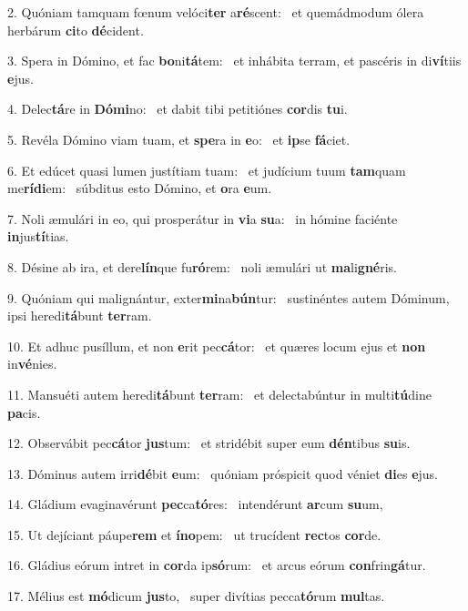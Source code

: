 2. Quóniam tamquam fœnum velóci\textbf{ter} a\textbf{ré}scent: \ast\  et quemádmodum ólera herbárum \textbf{ci}to \textbf{dé}cident.\

3. Spera in Dómino, et fac \textbf{bo}ni\textbf{tá}tem: \ast\  et inhábita terram, et pascéris in di\textbf{ví}tiis \textbf{e}jus.\

4. Delec\textbf{tá}re in \textbf{Dó}\textbf{mi}no: \ast\  et dabit tibi petitiónes \textbf{cor}dis \textbf{tu}i.\

5. Revéla Dómino viam tuam, et \textbf{spe}ra in \textbf{e}o: \ast\  et \textbf{ip}se \textbf{fá}ciet.\

6. Et edúcet quasi lumen justítiam tuam: \dag\  et judícium tuum \textbf{tam}quam me\textbf{rí}\textbf{di}em: \ast\  súbditus esto Dómino, et \textbf{o}ra \textbf{e}um.\

7. Noli æmulári in eo, qui prosperátur in \textbf{vi}a \textbf{su}a: \ast\  in hómine faciénte \textbf{in}jus\textbf{tí}tias.\

8. Désine ab ira, et dere\textbf{lín}que fu\textbf{ró}rem: \ast\  noli æmulári ut \textbf{ma}li\textbf{gné}ris.\

9. Quóniam qui malignántur, exter\textbf{mi}na\textbf{bún}tur: \ast\  sustinéntes autem Dóminum, ipsi heredi\textbf{tá}bunt \textbf{ter}ram.\

10. Et adhuc pusíllum, et non \textbf{e}rit pec\textbf{cá}tor: \ast\  et quæres locum ejus et \textbf{non} in\textbf{vé}nies.\

11. Mansuéti autem heredi\textbf{tá}bunt \textbf{ter}ram: \ast\  et delectabúntur in multi\textbf{tú}dine \textbf{pa}cis.\

12. Observábit pec\textbf{cá}tor \textbf{jus}tum: \ast\  et stridébit super eum \textbf{dén}tibus \textbf{su}is.\

13. Dóminus autem irri\textbf{dé}bit \textbf{e}um: \ast\  quóniam próspicit quod véniet \textbf{di}es \textbf{e}jus.\

14. Gládium evaginavérunt \textbf{pec}ca\textbf{tó}res: \ast\  intendérunt \textbf{ar}cum \textbf{su}um,\

15. Ut dejíciant páupe\textbf{rem} et \textbf{ín}\textbf{o}pem: \ast\  ut trucídent \textbf{rec}tos \textbf{cor}de.\

16. Gládius eórum intret in \textbf{cor}da ip\textbf{só}rum: \ast\  et arcus eórum \textbf{con}frin\textbf{gá}tur.\

17. Mélius est \textbf{mó}dicum \textbf{jus}to, \ast\  super divítias pecca\textbf{tó}rum \textbf{mul}tas.\

